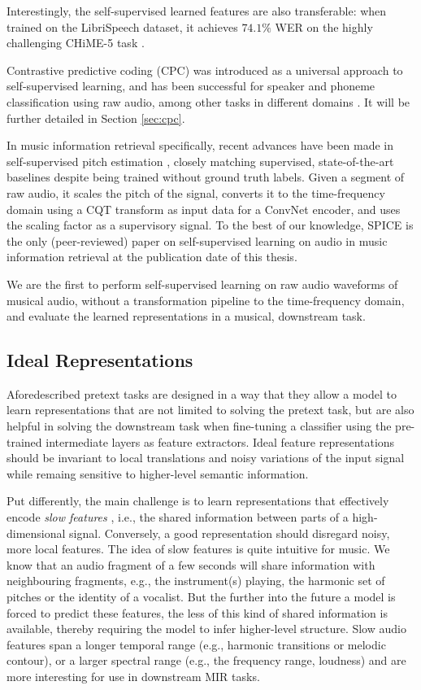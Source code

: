 Interestingly, the self-supervised learned features are also transferable: when trained on the LibriSpeech dataset, it achieves $74.1\%$ WER on the highly challenging CHiME-5 task \cite{barker2018fifth}.

Contrastive predictive coding (CPC) was introduced as a universal approach to self-supervised learning, and has been successful for speaker and phoneme classification using raw audio, among other tasks in different domains \cite{oord_representation_2019}.
It will be further detailed in Section \ref{sec:cpc}.

In music information retrieval specifically, recent advances have been made in self-supervised pitch estimation \cite{spice}, closely matching supervised, state-of-the-art baselines despite being trained without ground truth labels.
Given a segment of raw audio, it scales the pitch of the signal, converts it to the time-frequency domain using a CQT transform as input data for a ConvNet encoder, and uses the scaling factor as a supervisory signal.
To the best of our knowledge, SPICE \cite{spice} is the only (peer-reviewed) paper on self-supervised learning on audio in music information retrieval at the publication date of this thesis.

We are the first to perform self-supervised learning on raw audio waveforms of musical audio, without a transformation pipeline to the time-frequency domain, and evaluate the learned representations in a musical, downstream task.

\subsection{Ideal Representations}
Aforedescribed pretext tasks are designed in a way that they allow a model to learn representations that are not limited to solving the pretext task, but are also helpful in solving the downstream task when fine-tuning a classifier using the pre-trained intermediate layers as feature extractors.
Ideal feature representations should be invariant to local translations and noisy variations of the input signal while remaing sensitive to higher-level semantic information.

Put differently, the main challenge is to learn representations that effectively encode \textit{slow features} \cite{wiskott_slow_2002}, i.e., the shared information between parts of a high-dimensional signal.
Conversely, a good representation should disregard noisy, more local features.
The idea of slow features is quite intuitive for music.
We know that an audio fragment of a few seconds will share information with neighbouring fragments, e.g., the instrument(s) playing, the harmonic set of pitches or the identity of a vocalist.
 But the further into the future a model is forced to predict these features, the less of this kind of shared information is available, thereby requiring the model to infer higher-level structure.
Slow audio features span a longer temporal range (e.g., harmonic transitions or melodic contour), or a larger spectral range (e.g., the frequency range, loudness) and are more interesting for use in downstream MIR tasks.


